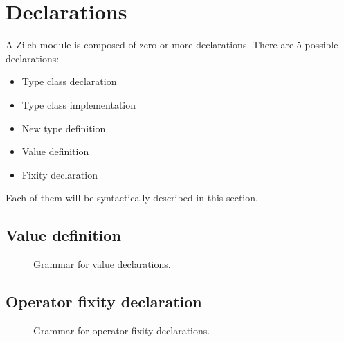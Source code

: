 \section{Declarations}\label{sec:zilch-grammar-declarations}

A Zilch module is composed of zero or more declarations.
There are 5 possible declarations:
\begin{itemize}
  \item Type class declaration
  \item Type class implementation
  \item New type definition
  \item Value definition
  \item Fixity declaration
\end{itemize}

\noindent Each of them will be syntactically described in this section.

\subsection{Value definition}\label{subsec:zilch-grammar-declarations-value}

\begin{figure}[H]
  \centering


  \caption{Grammar for value declarations.}
  \label{fig:zilch-grammar-declarations-value-grammar}
\end{figure}

\subsection{Operator fixity declaration}\label{subsec:zilch-grammar-declarations-fixity}

\begin{figure}[H]
  \centering


  \caption{Grammar for operator fixity declarations.}
  \label{fig:zilch-grammar-declarations-fixity-grammar}
\end{figure}

